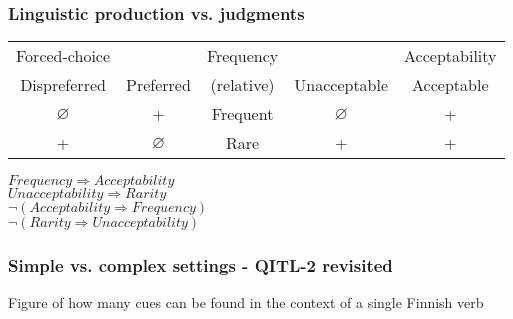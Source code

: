 \begin{frame}
\frametitle{Linguistic production vs. judgments}

{\scriptsize
\begin{table}[h]
\begin{tabular}{ c  c || c || c  c}
\hline
Forced-choice &               & Frequency  &               & Acceptability \\
Dispreferred  & Preferred     & (relative) & Unacceptable  & Acceptable  \\ \hline \hline
\multicolumn{1}{c|}{$\varnothing$} & +             & Frequent   & \multicolumn{1}{c|}{$\varnothing$} & +           \\ \hline
\multicolumn{1}{c|}{+}             & $\varnothing$ & Rare       & \multicolumn{1}{c|}{+}             & +           \\
\hline
\end{tabular}
\end{table}
}

      $Frequency \Rightarrow Acceptability$ \\
      $Unacceptability \Rightarrow Rarity$ \\
      $\neg(Acceptability \Rightarrow Frequency)$ \\
      $\neg(Rarity \Rightarrow Unacceptability)$ \\

\end{frame}

\begin{frame}
  \frametitle{Simple vs. complex settings - QITL-2 revisited}

Figure of how many cues can be found in the context of a single Finnish verb
  
\end{frame}





